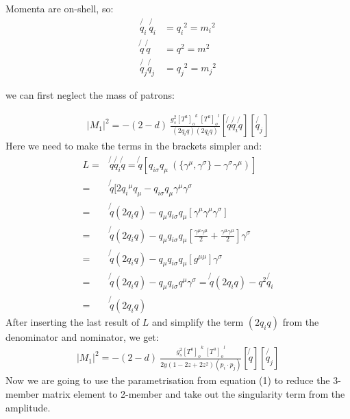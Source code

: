 Momenta are on-shell, so:
\begin{equation}
\begin{split}
\not{q_i}\: \not{q_i} &= {q_i}^2= {m_i}^2\\
\not{q} \: \not{q} &= {q}^2= {m}^2\\
\not{q_j}\not{q_j} &= {q_j}^2= {m_j}^2
\end{split}
\end{equation}

we can first neglect the mass of patrons:

\begin{equation}
\begin{split}
|M_1|^2=-(2-d)\:\frac{g_s^2  {[T^a]_{o}}^k \: {[T^a]_o}^l }{(2q_i q)(2q_i q)}
[\not{q} \not{q_i} \not{q}]
[\not{q_j}]
\end{split}
\end{equation}
Here we need to make the terms in the brackets simpler and:
\begin{equation}
\begin{split}
L=& \not{q} \not{q_i} \not{q} =\not{q}[{q_{i\sigma}} q_{\mu} \: (\lbrace{\gamma^{\mu}}, {\gamma^{\sigma}}\rbrace - {\gamma^{\sigma}}{\gamma^{\mu}})]\\ 
=& \not{q}[2{q_{i}}^{\mu} q_{\mu} - {q_{i\sigma}}q_{\mu}{\gamma^{\mu}}{\gamma^{\sigma}}\\
=& \not{q} (2q_i q)-q_{\mu}{q_{i\sigma}}q_{\mu}[{\gamma^{\mu}}{\gamma^{\mu}}{\gamma^{\sigma}}]\\
=& \not{q} (2q_i q)-q_{\mu}{q_{i\sigma}}q_{\mu}[\frac{{\gamma^{\mu}}{\gamma^{\mu}}}{2} +\frac{{\gamma^{\mu}}{\gamma^{\mu}}}{2}]{\gamma^{\sigma}}\\
=& \not{q} (2q_i q)-q_{\mu}{q_{i\sigma}}q_{\mu}[g^{{\mu}{\mu}}]{\gamma^{\sigma}}\\
=& \not{q} (2q_i q)-q_{\mu}{q_{i\sigma}}q^{\mu}{\gamma^{\sigma}}
=\not{q} (2q_i q)-q^2 \not{q_i}\\
=& \not{q} (2q_i q)
\end{split}
\end{equation}
After inserting the last result of $ L $ and simplify the term $ (2q_i q) $ from the denominator and nominator, we get:
\begin{equation}
\begin{split}
|M_1|^2=-(2-d)\:\frac{g_s^2  {[T^a]_{o}}^k \: {[T^a]_o}^l }{2y(1-2z+2z^2)(p_i \cdot p_j)}
[\not{q}]
[\not{q_j}]
\end{split}
\end{equation}
Now we are going to use the parametrisation from equation (1) to reduce the 3-member matrix element to 2-member and take out the singularity term from the amplitude.
